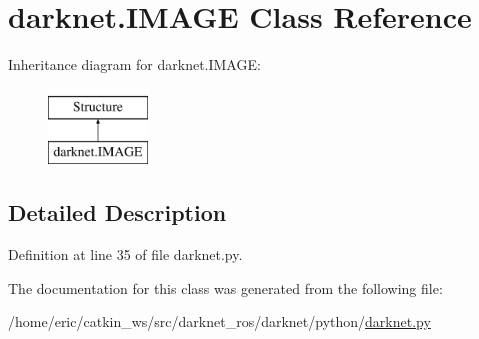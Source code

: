 \hypertarget{classdarknet_1_1IMAGE}{}\section{darknet.\+I\+M\+A\+GE Class Reference}
\label{classdarknet_1_1IMAGE}
Inheritance diagram for darknet.\+I\+M\+A\+GE\+:\begin{figure}[H]
\begin{center}
\leavevmode
\includegraphics[height=2.000000cm]{classdarknet_1_1IMAGE}
\end{center}
\end{figure}


\subsection{Detailed Description}


Definition at line 35 of file darknet.\+py.



The documentation for this class was generated from the following file\+:\begin{DoxyCompactItemize}
\item 
/home/eric/catkin\+\_\+ws/src/darknet\+\_\+ros/darknet/python/\mbox{\hyperlink{darknet_8py}{darknet.\+py}}\end{DoxyCompactItemize}
